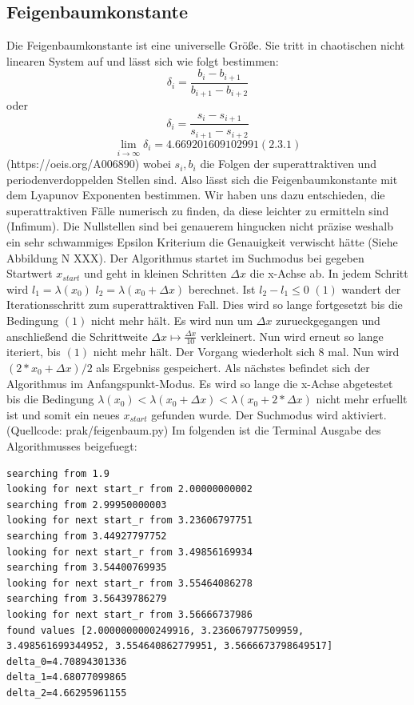 \documentclass{scrartcl}
\begin{document}
\subsection{Feigenbaumkonstante}
Die Feigenbaumkonstante ist eine universelle Größe. Sie tritt in chaotischen nicht linearen System auf und lässt sich wie folgt bestimmen:
$$\delta_i = \frac{b_i-b_{i+1}}{b_{i+1}-b_{i+2}}$$ oder $$\delta_i = \frac{s_i-s_{i+1}}{s_{i+1}-s_{i+2}}$$
$$\lim\limits_{i \rightarrow \infty}{\delta_i} = 4.669201609102991 (2.3.1) $$ (https://oeis.org/A006890)
wobei $s_i, b_i$ die Folgen der superattraktiven und periodenverdoppelden Stellen sind.
Also lässt sich die Feigenbaumkonstante mit dem Lyapunov Exponenten bestimmen. 
Wir haben uns dazu entschieden, die superattraktiven Fälle numerisch zu finden, da diese leichter zu ermitteln sind (Infimum). Die Nullstellen sind bei genauerem hingucken nicht präzise weshalb ein sehr schwammiges Epsilon Kriterium die Genauigkeit verwischt hätte (Siehe Abbildung N XXX). 
Der Algorithmus startet im Suchmodus bei gegeben Startwert $x_{start}$ und geht in kleinen Schritten $\Delta x$ die x-Achse ab. In jedem Schritt wird $l_1=\lambda(x_0)$ $l_2=\lambda(x_0 + \Delta x)$ berechnet. 
Ist $l_2-l_1 \leq 0$ $(1) $ wandert der Iterationsschritt zum superattraktiven Fall. 
Dies wird so lange fortgesetzt bis die Bedingung $(1)$ nicht mehr hält. 
Es wird nun um $\Delta x$ zurueckgegangen und anschließend die Schrittweite $\Delta x \mapsto \frac{\Delta x}{10} $ verkleinert. Nun wird erneut so lange iteriert, bis $(1)$ nicht mehr hält. 
Der Vorgang wiederholt sich 8 mal. Nun wird $(2*x_0 + \Delta x )/2$ als Ergebniss gespeichert. 
Als nächstes befindet sich der Algorithmus im Anfangspunkt-Modus. Es wird so lange die x-Achse abgetestet bis die Bedingung $\lambda(x_0) < \lambda(x_0 + \Delta x) < \lambda(x_0 + 2*\Delta x)$ nicht mehr erfuellt ist und somit ein neues $x_{start}$ gefunden wurde. Der Suchmodus wird aktiviert.  (Quellcode: prak/feigenbaum.py)
Im folgenden ist die Terminal Ausgabe des Algorithmusses beigefuegt:
\begin{lstlisting}
searching from 1.9
looking for next start_r from 2.00000000002
searching from 2.99950000003
looking for next start_r from 3.23606797751
searching from 3.44927797752
looking for next start_r from 3.49856169934
searching from 3.54400769935
looking for next start_r from 3.55464086278
searching from 3.56439786279
looking for next start_r from 3.56666737986
found values [2.0000000000249916, 3.236067977509959, 3.498561699344952, 3.554640862779951, 3.5666673798649517]
delta_0=4.70894301336
delta_1=4.68077099865
delta_2=4.66295961155
\end{lstlisting}
\end{document}
